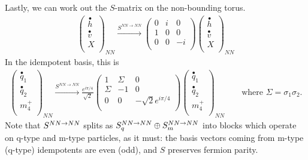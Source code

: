 Lastly, we can work out the $S$-matrix on the non-bounding torus.
\begin{align}
\left( \begin{matrix}
\stackrel{\bullet}{h} \\
\stackrel{\bullet}{v} \\
X \\
\end{matrix} \right)_{NN}
\xrightarrow{S^{NN\rightarrow NN}} 
\left( \begin{matrix}
0&i  &0 \\ 
1&0 &0 \\
0&0& -i \\
\end{matrix} \right)
\left( \begin{matrix}
\stackrel{\bullet}{h} \\
\stackrel{\bullet}{v} \\
X \\\end{matrix} \right)_{NN}
\end{align}
In the idempotent basis, this is
\begin{align}   \label{hE6_S_NN}
\left( \begin{matrix}
\stackrel{\bullet}{q}_{1}\\
\stackrel{\bullet}{q}_{2}\\
m_4^+ \\ 
\end{matrix} \right)_{NN}
 \xrightarrow{S^{NN \rightarrow NN}}
\frac{e^{i \pi /4}}{\sqrt{2}}\left( \begin{matrix} 
1&\Sigma &0 \\
\Sigma &-1&0\\
0&0& -\sqrt{2} e^{i \pi /4}\\
\end{matrix} \right)
\left( \begin{matrix}
\stackrel{\bullet}{q}_{1}\\
\stackrel{\bullet}{q}_{2}\\
m_4^+ \\ 
\end{matrix} \right)_{NN}
\quad \quad \text{where $\Sigma = \sigma_1 \sigma_2$.}
\end{align}
Note that $S^{NN\rightarrow NN}$ splits as $S^{NN\rightarrow NN}_q \oplus S^{NN\rightarrow NN}_m$ into blocks which operate 
on q-type and m-type particles, as it must: 
the basis vectors coming from m-type (q-type) idempotents are even (odd), and $S$ preserves fermion parity.

